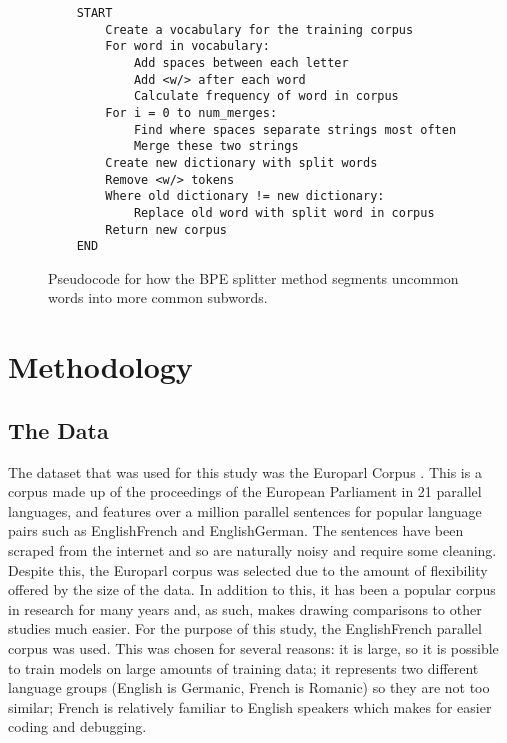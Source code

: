 \documentclass[11pt]{article}
\begin{document}
\begin{figure}[h]
\begin{verbatim}
    START
        Create a vocabulary for the training corpus
        For word in vocabulary:
            Add spaces between each letter
            Add <w/> after each word
            Calculate frequency of word in corpus
        For i = 0 to num_merges:
            Find where spaces separate strings most often
            Merge these two strings
        Create new dictionary with split words
        Remove <w/> tokens
        Where old dictionary != new dictionary:
            Replace old word with split word in corpus
        Return new corpus
    END
\end{verbatim}
\caption{Pseudocode for how the BPE splitter method segments uncommon words into more common subwords.}
\label{table:pseudocode2}
\end{figure}

\newpage

\section{Methodology}

\subsection{The Data}

The dataset that was used for this study was the Europarl Corpus \citep{koehn2005europarl}. This is a corpus made up of the proceedings of the European Parliament in 21 parallel languages, and features over a million parallel sentences for popular language pairs such as English\textendash French and English\textendash German. The sentences have been scraped from the internet and so are naturally noisy and require some cleaning. Despite this, the Europarl corpus was selected due to the amount of flexibility offered by the size of the data. In addition to this, it has been a popular corpus in research for many years and, as such, makes drawing comparisons to other studies much easier. For the purpose of this study, the English\textendash French parallel corpus was used. This was chosen for several reasons: it is large, so it is possible to train models on large amounts of training data; it represents two different language groups (English is Germanic, French is Romanic) so they are not too similar; French is relatively familiar to English speakers which makes for easier coding and debugging.
\end{document}
